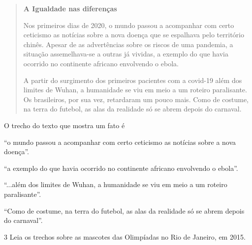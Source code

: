 \begin{quote}
\textbf{A Igualdade nas diferenças}


Nos primeiros dias de 2020, o mundo passou a acompanhar com certo
ceticismo as notícias sobre a nova doença que se espalhava pelo
território chinês. Apesar de as advertências sobre os riscos de uma
pandemia, a situação assemelhava-se a outras já vividas, a exemplo do
que havia ocorrido no continente africano envolvendo o ebola.

A partir do surgimento dos primeiros pacientes com a covid-19 além dos
limites de Wuhan, a humanidade se viu em meio a um roteiro paralisante.
Os brasileiros, por sua vez, retardaram um pouco mais. Como de costume,
na terra do futebol, as alas da realidade só se abrem depois do
carnaval.

\end{quote}

O trecho do texto que mostra um fato é

\begin{escolha}
\item ``o mundo passou a acompanhar com certo ceticismo as notícias sobre
a nova doença''.

\item ``a exemplo do que havia ocorrido no continente africano envolvendo
o ebola''.

\item ``...além dos limites de Wuhan, a humanidade se viu em meio a um
roteiro paralisante''.

\item ``Como de costume, na terra do futebol, as alas da realidade só se
abrem depois do carnaval''.
\end{escolha}

\num{3} Leia os trechos sobre as mascotes das Olimpíadas no Rio de Janeiro, em 2015.


